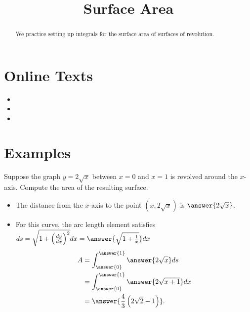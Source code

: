 \documentclass{ximera}
\title{Surface Area}
\begin{document}
\begin{abstract}
We practice setting up integrals for the surface area of surfaces of revolution.
\end{abstract}
\maketitle

\section*{Online Texts}
\begin{itemize}
\item {}
\item {}
\item {}
\end{itemize}

\section*{Examples}

\begin{example}
Suppose the graph $y = 2\sqrt{x}$ between $x = 0$ and $x = 1$ is revolved around the $x$-axis. Compute the area of the resulting surface.
\begin{itemize}
\item The distance from the $x$-axis to the point $(x,2\sqrt{x})$ is $\answer{2 \sqrt{x}}$.
\item For this curve, the arc length element satisfies $ds = \sqrt{1 + \left( \frac{dy}{dx} \right)^2} dx = \answer{\sqrt{1 + \frac{1}{x}}} dx$
\[ \begin{aligned} A & = \int_{\answer{0}}^{\answer{1}} \answer{2\sqrt{x}} ds \\
& = \int_{\answer{0}}^{\answer{1}} \answer{2 \sqrt{x+1}} dx \\
&= \answer{\frac{4}{3} \left( 2\sqrt{2} - 1 \right)}.
\end{aligned} \]
\end{itemize}
\end{example}
\end{document}
